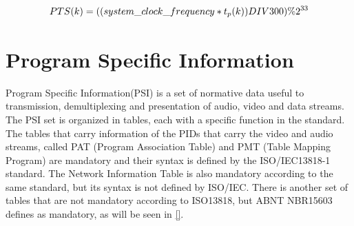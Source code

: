 \documentclass[
	12pt,				%
	openright,			%
	twoside,			%
	a4paper,			%
	brazil,
	french,				%
	english
	]{abntex2}
\begin{document}
\begin{equation}
PTS(k) = ((system\_clock\_frequency * t_p(k)) DIV 300) \% 2^{33}\\
\label{eq:pts}
\end{equation}





\section{Program Specific Information}
\label{iso_psi}

Program Specific Information(PSI) is a set of normative data useful to transmission, demultiplexing and presentation of audio, video and data streams. The PSI set is organized in tables, each with a specific function in the standard. The tables that carry information of the PIDs that carry the video and audio streams, called PAT (Program Association Table) and PMT (Table Mapping Program) are mandatory and their syntax is defined by the ISO/IEC13818-1 standard. The Network Information Table is also mandatory according to the same standard, but its syntax is not defined by ISO/IEC. There is another set of tables that are not mandatory according to ISO13818, but ABNT NBR15603 defines as mandatory, as will be seen in \autoref{}.
\end{document}
